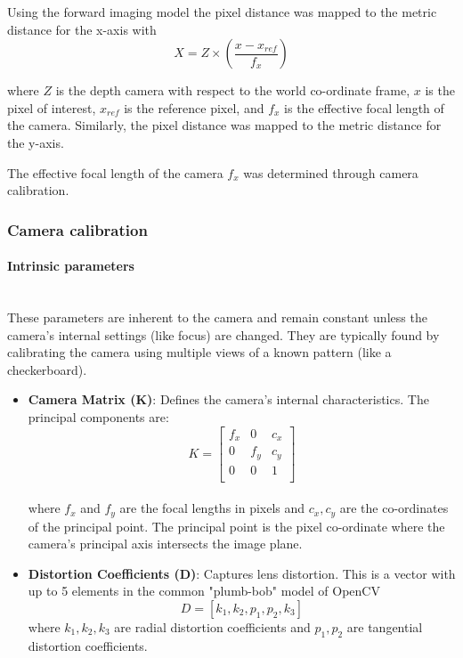 Using the forward imaging model the pixel distance was mapped to the metric distance for the x-axis with
\begin{equation}
    X = Z \times \left( \frac{x - x_{ref}}{f_x} \right)
    \label{eq:pixel_to_metric}
\end{equation}

where $Z$ is the depth camera with respect to the world co-ordinate frame, $x$ is the pixel of interest, $x_{ref}$ is the reference pixel, and $f_x$ is the effective focal length of the camera. Similarly, the pixel distance was mapped to the metric distance for the y-axis.

The effective focal length of the camera $f_x$ was determined through camera calibration.

\subsubsection{Camera calibration}
\paragraph{Intrinsic parameters}\mbox{}\\
These parameters are inherent to the camera and remain constant unless the camera's internal settings (like focus) are changed. They are typically found by calibrating the camera using multiple views of a known pattern (like a checkerboard).

\begin{itemize}
    \item \textbf{Camera Matrix (K)}: Defines the camera's internal characteristics. The principal components are:
          \begin{equation}
              K = \begin{bmatrix}
                  f_x & 0   & c_x \\
                  0   & f_y & c_y \\
                  0   & 0   & 1   \\
              \end{bmatrix}
          \end{equation}\\
          where \(f_x\) and \(f_y\) are the focal lengths in pixels and \(c_x, c_y\) are the co-ordinates of the principal point. The principal point is the pixel co-ordinate where the camera's principal axis intersects the image plane.

    \item \textbf{Distortion Coefficients (D)}: Captures lens distortion. This is a vector with up to 5 elements in the common "plumb-bob" model of OpenCV
          \[
              D = [k_1, k_2, p_1, p_2, k_3]
          \]
          where \(k_1, k_2, k_3\) are radial distortion coefficients and \(p_1, p_2\) are tangential distortion coefficients.
\end{itemize}

